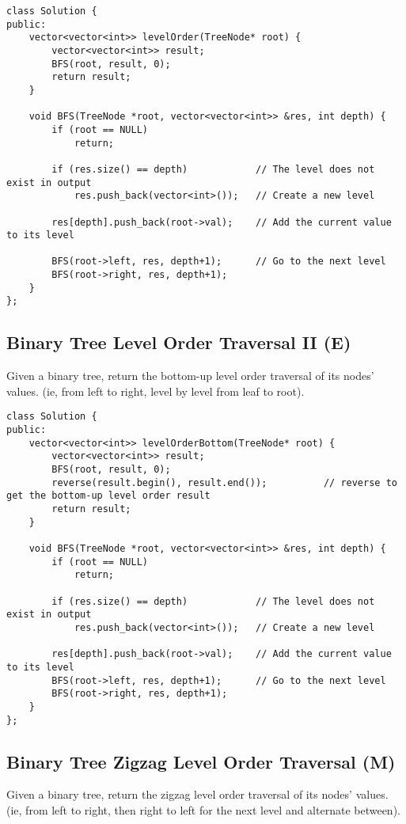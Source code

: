 \begin{lstlisting}
class Solution {
public:
    vector<vector<int>> levelOrder(TreeNode* root) {
        vector<vector<int>> result;
        BFS(root, result, 0);
        return result;
    }
    
    void BFS(TreeNode *root, vector<vector<int>> &res, int depth) {
        if (root == NULL)
            return;
        
        if (res.size() == depth)            // The level does not exist in output
            res.push_back(vector<int>());   // Create a new level
            
        res[depth].push_back(root->val);    // Add the current value to its level
        
        BFS(root->left, res, depth+1);      // Go to the next level
        BFS(root->right, res, depth+1);
    }
};
\end{lstlisting}


\subsection{Binary Tree Level Order Traversal II (E)}
Given a binary tree, return the bottom-up level order traversal of its nodes' values. (ie, from left to right, level by level from leaf to root).\\

\begin{lstlisting}
class Solution {
public:
    vector<vector<int>> levelOrderBottom(TreeNode* root) {
        vector<vector<int>> result;
        BFS(root, result, 0);
        reverse(result.begin(), result.end());          // reverse to get the bottom-up level order result
        return result;
    }
    
    void BFS(TreeNode *root, vector<vector<int>> &res, int depth) {
        if (root == NULL)
            return;
        
        if (res.size() == depth)            // The level does not exist in output
            res.push_back(vector<int>());   // Create a new level
            
        res[depth].push_back(root->val);    // Add the current value to its level
        BFS(root->left, res, depth+1);      // Go to the next level
        BFS(root->right, res, depth+1);
    }
};
\end{lstlisting}


\subsection{Binary Tree Zigzag Level Order Traversal (M)}
Given a binary tree, return the zigzag level order traversal of its nodes' values. (ie, from left to right, then right to left for the next level and alternate between).\\

